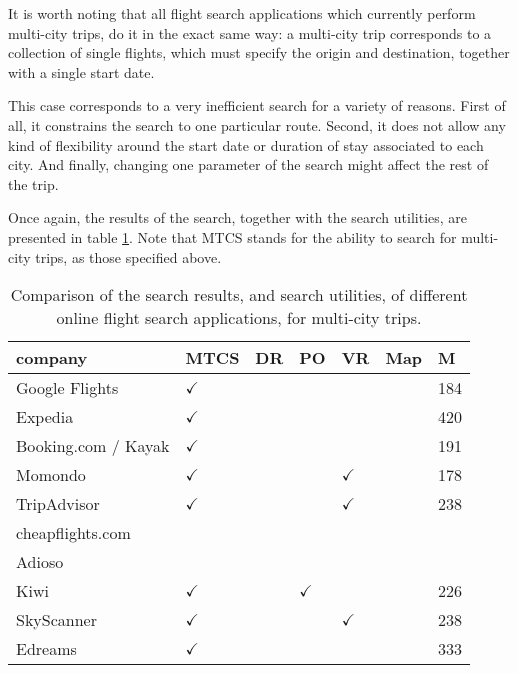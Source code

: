 It is worth noting that all flight search applications which currently perform multi-city trips,
do it in the exact same way: a multi-city trip corresponds to a collection of single flights,
which must specify the origin and destination, together with a single start date.

This case corresponds to a very inefficient search for a variety of reasons.
First of all, it constrains the search to one particular route. Second, it does not allow 
any kind of flexibility around the start date or duration of stay associated to each city. 
And finally, changing one parameter of the search might affect the rest of the trip.

Once again, the results of the search, together with the search utilities, are presented in table \ref{tab:multi_city_analysis}.
Note that MTCS stands for the ability to search for multi-city trips, as those specified above.

\begin{table}[h]
  \centering
  \caption{Comparison of the search results, and search utilities, of different online flight search applications, for multi-city trips.}
  \label{tab:multi_city_analysis}
  \begin{tabular}{|l|l|l|l|l|l|l|}
  \hline
  company             & MTCS       & DR  & PO         & VR         & Map                      & M                           \\ \hline
  Google Flights      & $\checkmark$ &       &            &            &                          & 184 \\ \hline
  Expedia             & $\checkmark$ &        &            &            &                          & 420                         \\ \hline
  Booking.com / Kayak & $\checkmark$ &        &            &            &                          & 191                         \\ \hline
  Momondo             & $\checkmark$ &        &            & $\checkmark$ &                          & \cellcolor[HTML]{C0C0C0}178 \\ \hline
  TripAdvisor         & $\checkmark$ &        &            & $\checkmark$ &  & 238                         \\ \hline
  cheapflights.com    &            &        &            &            &                          &                             \\ \hline
  Adioso              &            &        &            &            &                          &                             \\ \hline
  Kiwi                & $\checkmark$ &        & $\checkmark$ &            &                          & 226                         \\ \hline
  SkyScanner          & $\checkmark$ &        &            & $\checkmark$ &                          & 238                         \\ \hline
  Edreams             & $\checkmark$ &        &            &            &  & 333                         \\ \hline
  \end{tabular}
\end{table}

